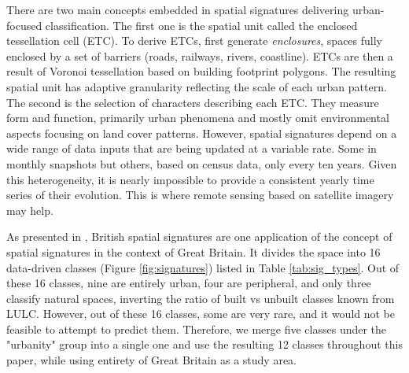 There are two main concepts embedded in spatial signatures delivering urban-focused
classification. The first one is the spatial unit called the enclosed tessellation cell
(ETC). To derive ETCs, \citep{dab_mf_2021a} first generate \textit{enclosures}, spaces fully enclosed by
a set of barriers (roads, railways, rivers, coastline). ETCs are then a result of
Voronoi tessellation based on building footprint polygons. The resulting spatial unit
has adaptive granularity reflecting the scale of each urban pattern. The
second is the selection of characters describing each ETC. They measure form and function,
primarily urban phenomena and mostly omit environmental aspects focusing on land
cover patterns. However, spatial signatures depend on a wide range of data inputs that
are being updated at a variable rate. Some in monthly snapshots but others,
based on census data, only every ten years. Given this heterogeneity,
it is nearly impossible to provide a consistent yearly time series of their evolution.
This is where remote sensing based on satellite imagery may help.


As presented in \cite{fleischmann2022geographical}, British spatial signatures are one
application of the concept of spatial signatures in
the context of Great Britain. It divides the space into 16 data-driven classes
(Figure \ref{fig:signatures}) listed in Table \ref{tab:sig_types}. Out of these 16
classes, nine are entirely urban, four are peripheral, and only three classify natural spaces,
inverting the ratio of built vs unbuilt classes known from LULC. However, out
of these 16 classes, some are very rare, and it would not be feasible to attempt to
predict them. Therefore, we merge five classes under the "urbanity" group into a
single one and use the resulting 12 classes throughout this paper, while using entirety
of Great Britain as a study area.



